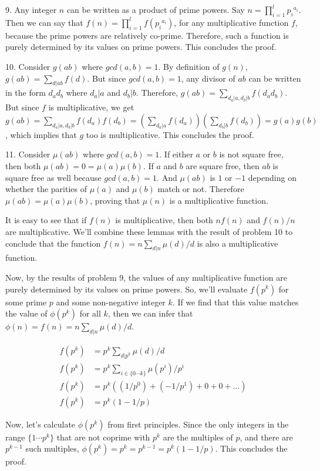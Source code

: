 \documentclass{article}
\begin{document}
9. Any integer $n$ can be written as a product of prime powers. Say $n = \prod_{i = 1}^l {p_i}^{a_i}$. Then we can say that $f(n) = \prod_{i = 1}^l f({p_i}^{a_i})$, for any multiplicative function $f$, because the prime powers are relatively co-prime. Therefore, such a function is purely determined by its values on prime powers. This concludes the proof.

10. Consider $g(ab)$ where $gcd(a, b) = 1$. By definition of $g(n)$, $g(ab) = \sum_{d | ab} f(d)$. But since $gcd(a, b) = 1$, any divisor of $ab$ can be written in the form $d_ad_b$ where $d_a | a$ and $d_b | b$. Therefore, $g(ab) = \sum_{d_a | a, d_b | b} f(d_ad_b)$. But since $f$ is multiplicative, we get $g(ab) = \sum_{d_a | a, d_b | b} f(d_a)f(d_b) = (\sum_{d_a | a} f(d_a))(\sum_{d_b | b} f(d_b)) = g(a)g(b)$, which implies that $g$ too is multiplicative. This concludes the proof.

11. Consider $\mu(ab)$ where $gcd(a, b) = 1$. If either $a$ or $b$ is not square free, then both $\mu(ab) = 0 = \mu(a)\mu(b)$. If $a$ and $b$ are square free, then $ab$ is square free as well because $gcd(a, b) = 1$. And $\mu(ab)$ is $1$ or $-1$ depending on whether the parities of $\mu(a)$ and $\mu(b)$ match or not. Therefore $\mu(ab) = \mu(a)\mu(b)$, proving that $\mu(n)$ is a multiplicative function.

It is easy to see that if $f(n)$ is multiplicative, then both $nf(n)$ and $f(n)/n$ are multiplicative. We'll combine these lemmas with the result of problem 10 to conclude that the function $f(n) = n \sum_{d | n} \mu(d) / d$ is also a multiplicative function.

Now, by the results of problem 9, the values of any multiplicative function are purely determined by its values on prime powers. So, we'll evaluate $f(p^k)$ for some prime $p$ and some non-negative integer $k$. If we find that this value matches the value of $\phi(p^k)$ for all $k$, then we can infer that $\phi(n) = f(n) = n \sum_{d | n} \mu(d) / d$.

\begin{align*}
    f(p^k) &= p^k \sum_{d | p^k} \mu(d) / d \\
    f(p^k) &= p^k \sum_{i \in \{0 \cdots k\}} \mu(p^i) / p^i \\
    f(p^k) &= p^k ((1 / p^0) + (-1 / p^1) + 0 + 0 + ...) \\
    f(p^k) &= p^k (1 - 1 / p)
\end{align*}

Now, let's calculate $\phi(p^k)$ from first principles. Since the only integers in the range $\{1 \cdots p^k\}$ that are not coprime with $p^k$ are the multiples of $p$, and there are $p^{k - 1}$ such multiples, $\phi(p^k) = p^k = p^{k - 1} = p^k(1 - 1 / p)$. This concludes the proof.
\end{document}
